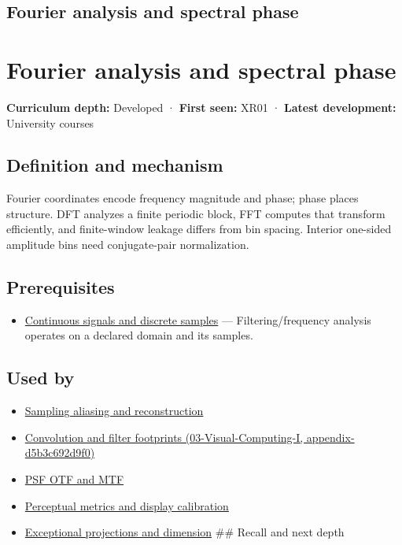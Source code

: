 \hypertarget{appendix-b60686ba06a1}{}
\section*{Fourier analysis and spectral phase}
\chapter{Fourier analysis and spectral phase}\label{appendix-b60686ba06a1-fourier-analysis-and-spectral-phase}

\textbf{Curriculum depth:} Developed · \textbf{First seen:} XR01 · \textbf{Latest development:} University courses

\section{Definition and mechanism}\label{appendix-b60686ba06a1-definition-and-mechanism}

Fourier coordinates encode frequency magnitude and phase; phase places structure. DFT analyzes a finite periodic block, FFT computes that transform efficiently, and finite-window leakage differs from bin spacing. Interior one-sided amplitude bins need conjugate-pair normalization.

\section{Prerequisites}\label{appendix-b60686ba06a1-prerequisites}

\begin{itemize}
\tightlist
\item
  \hyperref[appendix-1077ea8fc737]{Continuous signals and discrete samples} --- Filtering/frequency analysis operates on a declared domain and its samples.
\end{itemize}

\section{Used by}\label{appendix-b60686ba06a1-used-by}

\begin{itemize}
\item
  \hyperref[appendix-6a7869dd79a6]{Sampling aliasing and reconstruction}
\item
  \href{../03-Visual-Computing-I/main.pdf\#nameddest=appendix-d5b3c692d9f0}{Convolution and filter footprints (03-Visual-Computing-I, appendix-d5b3c692d9f0)}
\item
  \hyperref[appendix-8b76b0efd27f]{PSF OTF and MTF}
\item
  \hyperref[appendix-b2c1846508bf]{Perceptual metrics and display calibration}
\item
  \hyperref[appendix-3c73f7862157]{Exceptional projections and dimension} \#\# Recall and next depth
\end{itemize}

